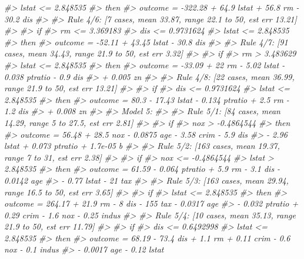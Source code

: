 \documentclass[]{book}
\newenvironment{Shaded}{\begin{snugshade}}{\end{snugshade}}
\newcommand{\CommentTok}[1]{\textcolor[rgb]{0.56,0.35,0.01}{\textit{#1}}}
\begin{document}
\begin{Shaded}
\begin{Highlighting}[]
\CommentTok{#>  lstat <= 2.848535}
\CommentTok{#>     then}
\CommentTok{#>  outcome = -322.28 + 64.9 lstat + 56.8 rm - 30.2 dis}
\CommentTok{#> }
\CommentTok{#>   Rule 4/6: [7 cases, mean 33.87, range 22.1 to 50, est err 13.21]}
\CommentTok{#> }
\CommentTok{#>     if}
\CommentTok{#>  rm <= 3.369183}
\CommentTok{#>  dis <= 0.9731624}
\CommentTok{#>  lstat <= 2.848535}
\CommentTok{#>     then}
\CommentTok{#>  outcome = -52.11 + 43.45 lstat - 30.8 dis}
\CommentTok{#> }
\CommentTok{#>   Rule 4/7: [91 cases, mean 34.43, range 21.9 to 50, est err 3.32]}
\CommentTok{#> }
\CommentTok{#>     if}
\CommentTok{#>  rm > 3.483629}
\CommentTok{#>  lstat <= 2.848535}
\CommentTok{#>     then}
\CommentTok{#>  outcome = -33.09 + 22 rm - 5.02 lstat - 0.038 ptratio - 0.9 dis}
\CommentTok{#>            + 0.005 zn}
\CommentTok{#> }
\CommentTok{#>   Rule 4/8: [22 cases, mean 36.99, range 21.9 to 50, est err 13.21]}
\CommentTok{#> }
\CommentTok{#>     if}
\CommentTok{#>  dis <= 0.9731624}
\CommentTok{#>  lstat <= 2.848535}
\CommentTok{#>     then}
\CommentTok{#>  outcome = 80.3 - 17.43 lstat - 0.134 ptratio + 2.5 rm - 1.2 dis}
\CommentTok{#>            + 0.008 zn}
\CommentTok{#> }
\CommentTok{#> Model 5:}
\CommentTok{#> }
\CommentTok{#>   Rule 5/1: [84 cases, mean 14.29, range 5 to 27.5, est err 2.81]}
\CommentTok{#> }
\CommentTok{#>     if}
\CommentTok{#>  nox > -0.4864544}
\CommentTok{#>     then}
\CommentTok{#>  outcome = 56.48 + 28.5 nox - 0.0875 age - 3.58 crim - 5.9 dis}
\CommentTok{#>            - 2.96 lstat + 0.073 ptratio + 1.7e-05 b}
\CommentTok{#> }
\CommentTok{#>   Rule 5/2: [163 cases, mean 19.37, range 7 to 31, est err 2.38]}
\CommentTok{#> }
\CommentTok{#>     if}
\CommentTok{#>  nox <= -0.4864544}
\CommentTok{#>  lstat > 2.848535}
\CommentTok{#>     then}
\CommentTok{#>  outcome = 61.59 - 0.064 ptratio + 5.9 rm - 3.1 dis - 0.0142 age}
\CommentTok{#>            - 0.77 lstat - 21 tax}
\CommentTok{#> }
\CommentTok{#>   Rule 5/3: [163 cases, mean 29.94, range 16.5 to 50, est err 3.65]}
\CommentTok{#> }
\CommentTok{#>     if}
\CommentTok{#>  lstat <= 2.848535}
\CommentTok{#>     then}
\CommentTok{#>  outcome = 264.17 + 21.9 rm - 8 dis - 155 tax - 0.0317 age}
\CommentTok{#>            - 0.032 ptratio + 0.29 crim - 1.6 nox - 0.25 indus}
\CommentTok{#> }
\CommentTok{#>   Rule 5/4: [10 cases, mean 35.13, range 21.9 to 50, est err 11.79]}
\CommentTok{#> }
\CommentTok{#>     if}
\CommentTok{#>  dis <= 0.6492998}
\CommentTok{#>  lstat <= 2.848535}
\CommentTok{#>     then}
\CommentTok{#>  outcome = 68.19 - 73.4 dis + 1.1 rm + 0.11 crim - 0.6 nox - 0.1 indus}
\CommentTok{#>            - 0.0017 age - 0.12 lstat}

\end{Highlighting}
\end{Shaded}
\end{document}
